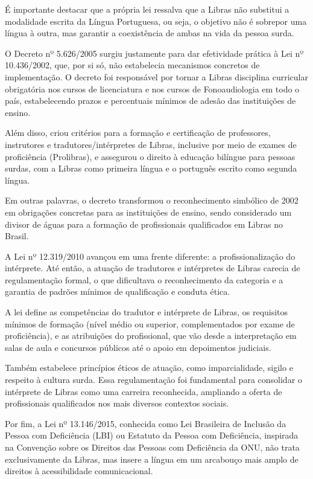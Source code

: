 \documentclass[
    12pt,                %
    openright,           %
    oneside,             %
    a4paper,             %
    english,             %
    brazil               %
]{abntex2}
\begin{document}
É importante destacar que a própria lei ressalva que a Libras não substitui a modalidade escrita da Língua Portuguesa, ou seja, o objetivo não é sobrepor uma língua à outra, mas garantir a coexistência de ambas na vida da pessoa surda.
 
O Decreto nº 5.626/2005 surgiu justamente para dar efetividade prática à Lei nº 10.436/2002, que, por si só, não estabelecia mecanismos concretos de implementação. O decreto foi responsável por tornar a Libras disciplina curricular obrigatória nos cursos de licenciatura e nos cursos de Fonoaudiologia em todo o país, estabelecendo prazos e percentuais mínimos de adesão das instituições de ensino.

Além disso, criou critérios para a formação e certificação de professores, instrutores e tradutores/intérpretes de Libras, inclusive por meio de exames de proficiência (Prolibras), e assegurou o direito à educação bilíngue para pessoas surdas, com a Libras como primeira língua e o português escrito como segunda língua. 

Em outras palavras, o decreto transformou o reconhecimento simbólico de 2002 em obrigações concretas para as instituições de ensino, sendo considerado um divisor de águas para a formação de profissionais qualificados em Libras no Brasil.
 
A Lei nº 12.319/2010 avançou em uma frente diferente: a profissionalização do intérprete. Até então, a atuação de tradutores e intérpretes de Libras carecia de regulamentação formal, o que dificultava o reconhecimento da categoria e a garantia de padrões mínimos de qualificação e conduta ética. 

A lei define as competências do tradutor e intérprete de Libras, os requisitos mínimos de formação (nível médio ou superior, complementados por exame de proficiência), e as atribuições do profissional, que vão desde a interpretação em salas de aula e concursos públicos até o apoio em depoimentos judiciais. 

Também estabelece princípios éticos de atuação, como imparcialidade, sigilo e respeito à cultura surda. Essa regulamentação foi fundamental para consolidar o intérprete de Libras como uma carreira reconhecida, ampliando a oferta de profissionais qualificados nos mais diversos contextos sociais.
 
Por fim, a Lei nº 13.146/2015, conhecida como Lei Brasileira de Inclusão da Pessoa com Deficiência (LBI) ou Estatuto da Pessoa com Deficiência, inspirada na Convenção sobre os Direitos das Pessoas com Deficiência da ONU, não trata exclusivamente da Libras, mas insere a língua em um arcabouço mais amplo de direitos à acessibilidade comunicacional. 
\end{document}
